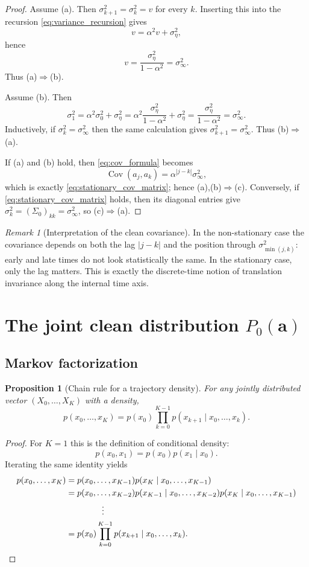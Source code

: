 \documentclass[11pt]{article}
\numberwithin{equation}{section}
\newtheorem{proposition}[theorem]{Proposition}
\theoremstyle{definition}
\theoremstyle{remark}
\newtheorem{remark}[theorem]{Remark}
\newcommand{\Cov}{\operatorname{Cov}}
\begin{document}
\begin{proof}
Assume (a). Then $\sigma_{k+1}^2=\sigma_k^2=v$ for every $k$. Inserting this into the recursion \eqref{eq:variance_recursion} gives
\[
v=\alpha^2 v+\sigma_\eta^2,
\]
hence
\[
v=\frac{\sigma_\eta^2}{1-\alpha^2}=\sigma_\infty^2.
\]
Thus (a)$\Rightarrow$(b).

Assume (b). Then
\[
\sigma_1^2=\alpha^2\sigma_0^2+\sigma_\eta^2
=\alpha^2\frac{\sigma_\eta^2}{1-\alpha^2}+\sigma_\eta^2
=\frac{\sigma_\eta^2}{1-\alpha^2}
=\sigma_\infty^2.
\]
Inductively, if $\sigma_k^2=\sigma_\infty^2$ then the same calculation gives $\sigma_{k+1}^2=\sigma_\infty^2$. Thus (b)$\Rightarrow$(a).

If (a) and (b) hold, then \eqref{eq:cov_formula} becomes
\[
\Cov(a_j,a_k)=\alpha^{|j-k|}\sigma_\infty^2,
\]
which is exactly \eqref{eq:stationary_cov_matrix}; hence (a),(b)$\Rightarrow$(c). Conversely, if \eqref{eq:stationary_cov_matrix} holds, then its diagonal entries give $\sigma_k^2=(\Sigma_0)_{kk}=\sigma_\infty^2$, so (c)$\Rightarrow$(a).
\end{proof}

\begin{remark}[Interpretation of the clean covariance]
In the non-stationary case the covariance depends on both the lag $|j-k|$ and the position through $\sigma_{\min(j,k)}^2$: early and late times do not look statistically the same. In the stationary case, only the lag matters. This is exactly the discrete-time notion of translation invariance along the internal time axis.
\end{remark}

\section{The joint clean distribution \texorpdfstring{$P_0(\mathbf a)$}{P0(a)}}\label{sec:P0}

\subsection{Markov factorization}

\begin{proposition}[Chain rule for a trajectory density]\label{prop:chain_rule}
For any jointly distributed vector $(X_0,\dots,X_K)$ with a density,
\[
p(x_0,\dots,x_K)=p(x_0)\prod_{k=0}^{K-1}p(x_{k+1}\mid x_0,\dots,x_k).
\]
\end{proposition}

\begin{proof}
For $K=1$ this is the definition of conditional density:
\[
p(x_0,x_1)=p(x_0)p(x_1\mid x_0).
\]
Iterating the same identity yields
\begin{align*}
p(x_0,\dots,x_K)
&=p(x_0,\dots,x_{K-1})p(x_K\mid x_0,\dots,x_{K-1}) \\
&=p(x_0,\dots,x_{K-2})p(x_{K-1}\mid x_0,\dots,x_{K-2})p(x_K\mid x_0,\dots,x_{K-1}) \\
&\hspace{1.5cm}\vdots \\
&=p(x_0)\prod_{k=0}^{K-1}p(x_{k+1}\mid x_0,\dots,x_k).
\end{align*}
\end{proof}
\end{document}
